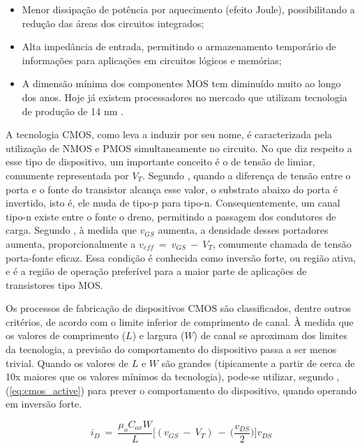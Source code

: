 \begin{itemize}
	\item Menor dissipação de potência por aquecimento (efeito Joule), possibilitando a redução das áreas dos circuitos integrados;
	\item Alta impedância de entrada, permitindo o armazenamento temporário de informações para aplicações em circuitos lógicos e memórias;
	\item A dimensão mínima dos componentes MOS tem diminuído muito ao longo dos anos. Hoje já existem processadores no mercado que utilizam tecnologia de produção de 14 nm \cite{INTEL:2015}.
\end{itemize}

A tecnologia CMOS, como leva a induzir por seu nome, é caracterizada pela utilização de NMOS e PMOS simultaneamente no circuito. No que diz respeito a esse tipo de dispositivo, um importante conceito é o de tensão de limiar, comumente representada por $V_T$. Segundo , quando a diferença de tensão entre o porta e o fonte do transistor alcança esse valor, o substrato abaixo do porta é invertido, isto é, ele muda de tipo-p para tipo-n. Consequentemente, um canal tipo-n existe entre o fonte o dreno, permitindo a passagem dos condutores de carga. Segundo , à medida que $v_{GS}$ aumenta, a densidade desses portadores aumenta, proporcionalmente a $v_{eff}~=~v_{GS}~-~V_T$, comumente chamada de tensão porta-fonte eficaz. Essa condição é conhecida como inversão forte, ou região ativa, e é a região de operação preferível para a maior parte de aplicações de transistores tipo MOS.

Os processos de fabricação de dispositivos {CMOS} são classificados, dentre outros critérios, de acordo com o limite inferior de comprimento de canal. À medida que os valores de comprimento ($L$) e largura ($W$) de canal se aproximam dos limites da tecnologia, a previsão do comportamento do dispositivo passa a ser menos trivial. Quando os valores de $L$ e $W$ são grandes (tipicamente a partir de cerca de 10x maiores que os valores mínimos da tecnologia), pode-se utilizar, segundo , (\ref{eq:cmos_active}) para prever o comportamento do dispositivo, quando operando em inversão forte.

\begin{equation}
	\label{eq:cmos_active}
	i_D~=~\dfrac{\mu_oC_{ox}W}{L} \Big [ (v_{GS}~-~V_T)~-~\Big ( \dfrac{v_{DS}}{2} \Big ) \Big ] v_{DS}
\end{equation}


